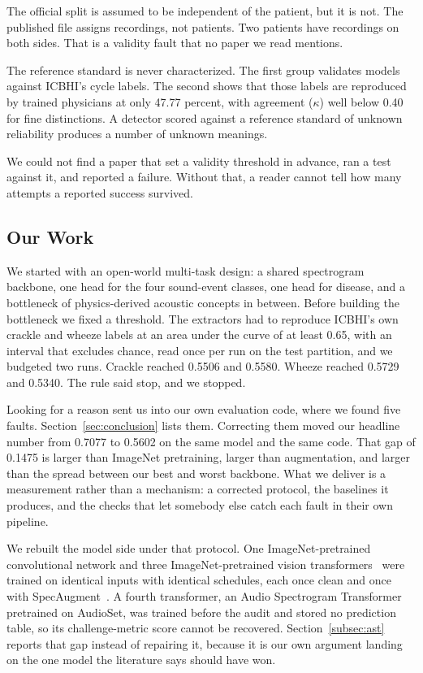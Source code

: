 \documentclass[journal,onecolumn]{IEEEtran}
\begin{document}
The official split is assumed to be independent of the patient, but it is not. The
published file assigns recordings, not patients. Two patients have recordings on both
sides. That is a validity fault that no paper we read mentions.

The reference standard is never characterized. The first group validates models
against ICBHI's cycle labels. The second shows that those labels are reproduced by
trained physicians at only 47.77 percent, with agreement ($\kappa$) well below 0.40 for
fine distinctions. A detector scored against a reference standard of unknown
reliability produces a number of unknown meanings.

We could not find a paper that set a validity threshold in advance, ran a test against it, and reported a failure. Without that, a reader cannot tell how many attempts a reported success survived.

\subsection{Our Work}
\label{subsec:ourwork}

We started with an open-world multi-task design: a shared spectrogram backbone, one head for
the four sound-event classes, one head for disease, and a bottleneck of physics-derived
acoustic concepts in between. Before building the bottleneck we fixed a threshold. The
extractors had to reproduce ICBHI's own crackle and wheeze labels at an area under the curve of
at least 0.65, with an interval that excludes chance, read once per run on the test partition,
and we budgeted two runs. Crackle reached 0.5506 and 0.5580. Wheeze reached 0.5729 and
0.5340. The rule said stop, and we stopped.

Looking for a reason sent us into our own evaluation code, where we found five faults.
Section~\ref{sec:conclusion} lists them. Correcting them moved our headline number from 0.7077
to 0.5602 on the same model and the same code. That gap of 0.1475 is larger than ImageNet
pretraining, larger than augmentation, and larger than the spread between our best and worst
backbone. What we deliver is a measurement rather than a mechanism: a corrected protocol, the
baselines it produces, and the checks that let somebody else catch each fault in their own
pipeline.

We rebuilt the model side under that protocol. One ImageNet-pretrained convolutional network
and three ImageNet-pretrained vision
transformers~\cite{dosovitskiy2021vit,liu2021swin,touvron2021deit} were trained on identical
inputs with identical schedules, each once clean and once with
SpecAugment~\cite{park2019specaugment}. A fourth transformer, an Audio Spectrogram
Transformer~\cite{gong2021ast} pretrained on AudioSet, was trained before the audit and stored
no prediction table, so its challenge-metric score cannot be recovered.
Section~\ref{subsec:ast} reports that gap instead of repairing it, because it is our own
argument landing on the one model the literature says should have won.
\end{document}
